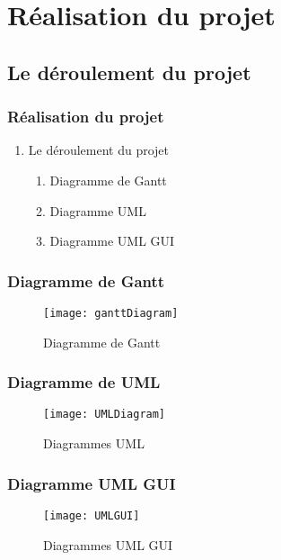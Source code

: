 \documentclass[12pt]{beamer}
\begin{document}
\section{Réalisation du projet}
\subsection{Le déroulement du projet}

\begin{frame}
\frametitle{Réalisation du projet}
 \begin{enumerate}
  \item Le déroulement du projet
    \begin{enumerate}
        \item Diagramme de Gantt
        \item Diagramme UML
	\item Diagramme UML GUI
    \end{enumerate}
 \end{enumerate}
\end{frame}



\begin{frame}
  \frametitle{Diagramme de Gantt}
  \begin{figure}[t]
    \centering
    \texttt{[image: ganttDiagram]}
    \caption{Diagramme de Gantt}
  \end{figure}
\end{frame}


\begin{frame}
  \frametitle{Diagramme de UML}
  \begin{figure}[t]
    \centering
    \texttt{[image: UMLDiagram]}
    \caption{Diagrammes UML}
  \end{figure}
\end{frame}

\begin{frame}
  \frametitle{Diagramme UML GUI}
  \begin{figure}[t]
    \centering
    \texttt{[image: UMLGUI]}
    \caption{Diagrammes UML GUI}
  \end{figure}
\end{frame}
\end{document}
